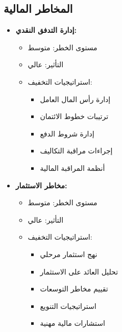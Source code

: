 \subsection{المخاطر المالية}
\begin{itemize}
    \item \textbf{إدارة التدفق النقدي:}
    \begin{itemize}
        \item مستوى الخطر: متوسط
        \item التأثير: عالي
        \item استراتيجيات التخفيف:
        \begin{itemize}
            \item إدارة رأس المال العامل
            \item ترتيبات خطوط الائتمان
            \item إدارة شروط الدفع
            \item إجراءات مراقبة التكاليف
            \item أنظمة المراقبة المالية
        \end{itemize}
    \end{itemize}
    
    \item \textbf{مخاطر الاستثمار:}
    \begin{itemize}
        \item مستوى الخطر: متوسط
        \item التأثير: عالي
        \item استراتيجيات التخفيف:
        \begin{itemize}
            \item نهج استثمار مرحلي
            \item تحليل العائد على الاستثمار
            \item تقييم مخاطر التوسعات
            \item استراتيجيات التنويع
            \item استشارات مالية مهنية
        \end{itemize}
    \end{itemize}
\end{itemize}

